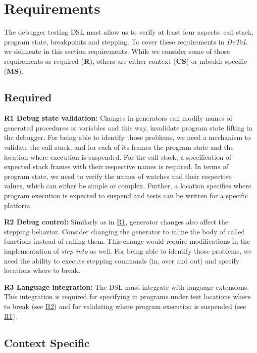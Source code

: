 \section{Requirements}
\label{DesignDecisions}

The debugger testing \ac{DSL} must allow us to verify at least
four aspects: call stack, program state, breakpoints and stepping.
To cover these requirements in \emph{DeTeL} we delineate in this section
requirements. While we
consider some of those requirements as required (\textbf{R}), others are either
context (\textbf{CS}) or mbeddr specific (\textbf{MS}).

\subsection{Required}

\textbf{\label{R1}R1 Debug state validation:} 
Changes in generators can modify names of generated procedures or
variables and this way, \eg invalidate program state lifting in the
debugger.
For being able to identify those problems, we need a  mechanism to validate
the call stack, and for each of its frames the program state and the location where
execution is suspended. For the call stack,
a specification of expected stack frames with their respective names is
required. In terms of program state, we need to verify the names of watches 
and their respective values, which can either be simple
or complex. Further, a location specifies where program execution is
expected to suspend and tests can be written for a specific platform. 

\textbf{\label{R2}R2 Debug control:} Similarly as in \hyperref[R1]{R1},
generator changes also affect the stepping behavior. 
Consider changing the  generator to inline the body of called
functions instead of calling them. This change would require modifications in
the implementation of \emph{step into} as well. For being able to identify
those problems, we need the ability to execute stepping commands (in, over
and out) and specify locations where to break.

\textbf{\label{R3}R3 Language integration:} The
\ac{DSL} must integrate with language extensions.
This integration is required for specifying in programs under test
locations where to break (see \hyperref[R2]{R2}) and for validating where
program execution is suspended (see \hyperref[R1]{R1}).

\subsection{Context Specific}

